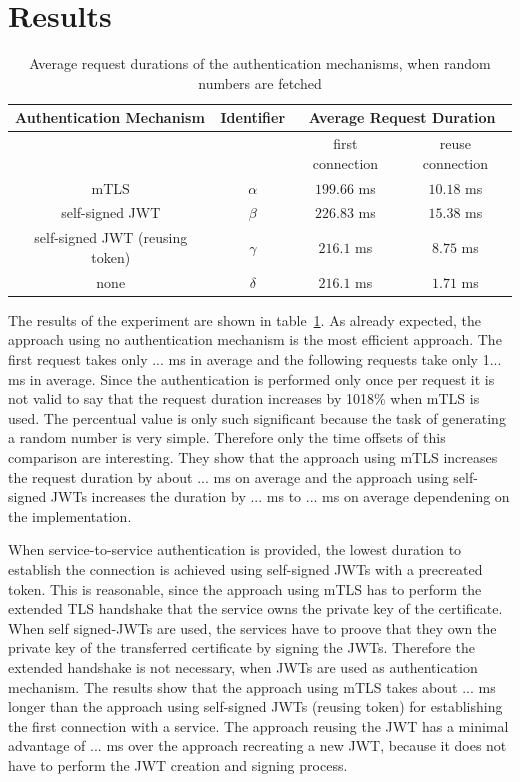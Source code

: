 \section{Results}

\begin{table}[H]
	\centering
\begin{tabular}{c|c|cc}
	\multicolumn{1}{l|}{\textbf{Authentication Mechanism}} & \textbf{Identifier} & \multicolumn{2}{c}{\textbf{Average Request Duration}} \\ \hline
	\multicolumn{1}{c|}{} & & \multicolumn{1}{c|}{first connection} & reuse connection \\ \hline
	mTLS & $\alpha$ & \multicolumn{1}{c|}{$199.66$ ms} & $10.18$ ms \\ \hline
	self-signed JWT & $\beta$ & \multicolumn{1}{c|}{$226.83$ ms} & $15.38$ ms \\ \hline
	self-signed JWT (reusing token) & $\gamma$ & \multicolumn{1}{c|}{$216.1$ ms} & $8.75$ ms \\ \hline 
	none & $\delta$ & \multicolumn{1}{c|}{$216.1$ ms} & $1.71$ ms
\end{tabular}
\caption{Average request durations of the authentication mechanisms, when random numbers are fetched}
\label{tab:experiment_case_1}
\end{table}

The results of the experiment are shown in table~\ref{tab:experiment_case_1}.
As already expected, the approach using no authentication mechanism is the most efficient approach.
The first request takes only ... ms in average and the following requests take only 1... ms in average.
Since the authentication is performed only once per request it is not valid to say that the request duration increases by 1018\% when mTLS is used.
The percentual value is only such significant because the task of generating a random number is very simple.
Therefore only the time offsets of this comparison are interesting.
They show that the approach using mTLS increases the request duration by about ... ms on average and the approach using self-signed JWTs increases the duration by ... ms to ... ms on average dependening on the implementation.

When service-to-service authentication is provided, the lowest duration to establish the connection is achieved using self-signed JWTs with a precreated token.
This is reasonable, since the approach using mTLS has to perform the extended TLS handshake that the service owns the private key of the certificate.
When self signed-JWTs are used, the services have to proove that they own the private key of the transferred certificate by signing the JWTs.
Therefore the extended handshake is not necessary, when JWTs are used as authentication mechanism.
The results show that the approach using mTLS takes about ... ms longer than the approach using self-signed JWTs (reusing token) for establishing the first connection with a service.
The approach reusing the JWT has a minimal advantage of ... ms over the approach recreating a new JWT, because it does not have to perform the JWT creation and signing process.


